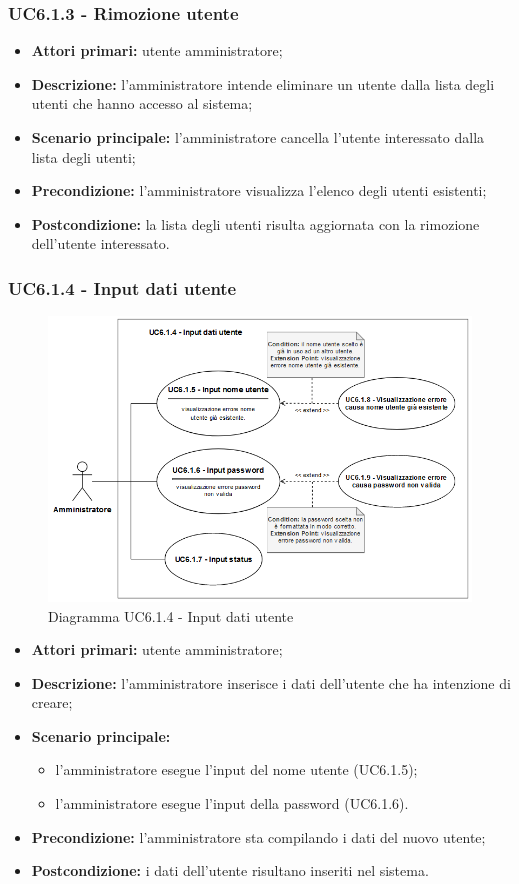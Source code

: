 \subsubsection{UC6.1.3 - Rimozione utente}
	\begin{itemize}
		\item \textbf{Attori primari:} utente amministratore;
		\item \textbf{Descrizione:} l'amministratore intende eliminare un utente dalla lista degli utenti che hanno accesso al sistema;
		\item \textbf{Scenario principale:} l'amministratore cancella l'utente interessato dalla lista degli utenti;
		\item \textbf{Precondizione:} l'amministratore visualizza l'elenco degli utenti esistenti;
		\item \textbf{Postcondizione:} la lista degli utenti risulta aggiornata con la rimozione dell'utente interessato.
	\end{itemize}

\subsubsection{UC6.1.4 - Input dati utente}
	\begin{figure}[h!]
		\centering
		\includegraphics[width=15cm]{images/UC6.1.4.png}
		\caption{Diagramma UC6.1.4 - Input dati utente}
	\end{figure}
	\begin{itemize}
		\item \textbf{Attori primari:} utente amministratore;
		\item \textbf{Descrizione:} l'amministratore inserisce i dati dell'utente che ha intenzione di creare;
		\item \textbf{Scenario principale:} 
			\begin{itemize}
				\item l'amministratore esegue l'input del nome utente (UC6.1.5);
				\item l'amministratore esegue l'input della password (UC6.1.6).
			\end{itemize}
		\item \textbf{Precondizione:} l'amministratore sta compilando i dati del nuovo utente;
		\item \textbf{Postcondizione:} i dati dell'utente risultano inseriti nel sistema.
	\end{itemize}

